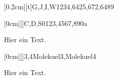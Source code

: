 \documentclass[./main.tex]{subfiles}
\begin{document}


\kastenarray{2.5cm}{3cm}[0.2cm][t]{G,J,I,W}{1234,6425,672,6489}

\kastenarray{3cm}{4cm}[0cm][]{C,D,S}{0123,4567,890a}

Hier ein Text. 


\kastenarray{7cm}{7cm}[0cm][]{3,4}{Molekuel3,Molekuel4}

Hier ein Text. 

\clearpage
\aufgabenende
\end{document}
